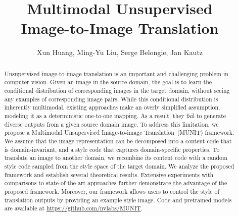 \documentclass[runningheads]{llncs}
\begin{document}
\pagestyle{headings}
	\mainmatter
	\def\ECCV18SubNumber{143}  

	\title{Multimodal Unsupervised \\Image-to-Image Translation} 




	\author{Xun Huang, Ming-Yu Liu, Serge Belongie, Jan Kautz}


	
\maketitle              

	
	\begin{abstract}
		Unsupervised image-to-image translation is an important and challenging problem in computer vision.
		Given an image in the source domain, the goal is to learn the conditional distribution of corresponding images in the target domain, without seeing any examples of corresponding image pairs.
		While this conditional distribution is inherently multimodal, existing approaches make an overly simplified assumption, modeling it as a deterministic one-to-one mapping. As a result, they fail to generate diverse outputs from a given source domain image. To address this limitation, we propose a Multimodal Unsupervised Image-to-image \mbox{Translation~(MUNIT)} framework. We assume that the image representation can be decomposed into a content code that is domain-invariant, and a style code that captures domain-specific properties. To translate an image to another domain, we recombine its content code with a random style code sampled from the style space of the target domain. We analyze the proposed framework and establish several theoretical results. Extensive experiments with comparisons to state-of-the-art approaches further demonstrate the advantage of the proposed framework. Moreover, our framework allows users to control the style of translation outputs by providing an example style image.
		Code and pretrained models are available at \href{https://github.com/nvlabs/MUNIT}{https://github.com/nvlabs/MUNIT}.
		

	\end{abstract}
\end{document}
